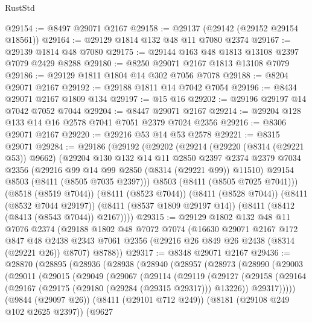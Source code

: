 \begin{lexlean}{RustStd}
\begin{coremodule}
@29154 := @8497 @29071 @2167
@29158 := @29137 (@29142 (@29152 @29154 @18561))
@29164 := @29129 @1814 @132 @48 @11 @7080 @2374
@29167 := @29139 @1814 @48 @7080
@29175 := @29144 @163 @48 @1813 @13108 @2397 @7079 @2429 @8288
@29180 := @8250 @29071 @2167 @1813 @13108 @7079
@29186 := @29129 @1811 @1804 @14 @302 @7056 @7078
@29188 := @8204 @29071 @2167
@29192 := @29188 @1811 @14 @7042 @7054
@29196 := @8434 @29071 @2167 @1809 @134
@29197 := @15 @16
@29202 := @29196 @29197 @14 @7042 @7052 @7044
@29204 := @8447 @29071 @2167
@29214 := @29204 @128 @133 @14 @16 @2578 @7041 @7051 @2379 @7024 @2356
@29216 := @8306 @29071 @2167
@29220 := @29216 @53 @14 @53 @2578
@29221 := @8315 @29071
@29284 := @29186
    (@29192
      (@29202
        (@29214
          (@29220 (@8314 (@29221 @53)) @9662)
          (@29204
            @130
            @132
            @14
            @11
            @2850
            @2397
            @2374
            @2379
            @7034
            @2356
            (@29216 @99 @14 @99 @2850 (@8314 (@29221 @99)) @11510)
            @29154
            @8503
            (@8411 (@8505 @7035 @2397)))
          @8503
          (@8411 (@8505 @7025 @7041)))
        (@8518 (@8519 @7044))
        (@8411 (@8523 @7044))
        (@8411 (@8528 @7044))
        (@8411 (@8532 @7044 @29197))
        (@8411 (@8537 @1809 @29197 @14))
        (@8411 (@8412 (@8413 (@8543 @7044)) @2167))))
@29315 := @29129
    @1802
    @132
    @48
    @11
    @7076
    @2374
    (@29188
      @1802
      @48
      @7072
      @7074
      (@16630
        @29071
        @2167
        @172
        @847
        @48
        @2438
        @2343
        @7061
        @2356
        (@29216 @26 @849 @26 @2438 (@8314 (@29221 @26)) @8707)
        @8788))
@29317 := @8348 @29071 @2167
@29436 := @28870
    (@28895
      (@28936
        (@28938
          (@28940
            (@28957
              (@28973
                (@28990
                  (@29003
                    (@29011
                      (@29015
                        (@29049
                          (@29067
                            (@29114
                              (@29119
                                (@29127
                                  (@29158
                                    (@29164
                                      (@29167 (@29175 (@29180 (@29284 (@29315 @29317))) @13226))
                                      @29317)))))
                            (@9844 (@29097 @26))
                            (@8411 (@29101 @712 @249))
                            (@8181 (@29108 @249 @102 @2625 @2397))
                            (@9627

\end{coremodule}
\end{lexlean}
